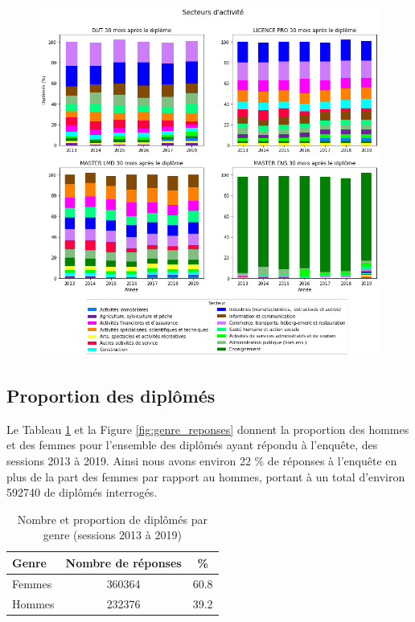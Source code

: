 \documentclass[12pt, a4paper, titlepage, table]{article}
\begin{document}
	\begin{figure}[H]
		\centering
		\includegraphics[width=1\textwidth]{../graphs/repartition_secteurs_situation.png}
	\end{figure}

	\subsection{Proportion des diplômés}
	Le Tableau \ref{tab:genre_responses} et la Figure \ref{fig:genre_reponses} donnent la proportion des hommes et des femmes pour l'ensemble des diplômés ayant répondu à l'enquête, des sessions 2013 à 2019. Ainsi nous avons environ 22 \% de réponses à l'enquête en plus de la part des femmes par rapport au hommes, portant à un total d'environ 592740 de diplômés interrogés.
	
		\begin{table}[H]
			\centering
			\begin{tabular}{lcc}
				\toprule
				\textbf{Genre} & \textbf{Nombre de réponses} & \textbf{\%} \\
				\midrule
				Femmes & 360364 & 60.8 \\
				Hommes & 232376 & 39.2 \\
				\bottomrule
			\end{tabular}
			\caption{Nombre et proportion de diplômés par genre (sessions 2013 à 2019)}
			\label{tab:genre_responses}
		\end{table}
	
\end{document}
